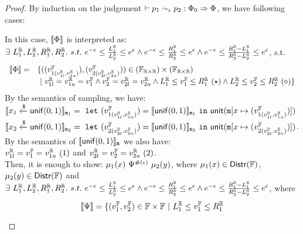 \documentclass[a4paper,11pt]{article}
\begin{document}
\begin{proof}
By induction on the judgement $\vdash p_1	
\sim_{\epsilon}
p_2 :
\Phi_0 \Rightarrow \Phi $, we have following cases:
\begin{itemize}
	In this case, 
	$\llbracket \Phi \rrbracket$ is interpreted as:
	$	\exists ~ L^{\mathbb{R}}_1, L^{\mathbb{R}}_2, R^{\mathbb{R}}_1, R^{\mathbb{R}}_2. ~ s.t. ~
	e^{-\epsilon} \leq 
	\frac{L^{\mathbb{R}}_1}{L^{\mathbb{R}}_2}
	\leq e^{\epsilon}
	\land
	e^{-\epsilon} \leq 
	\frac{R^{\mathbb{R}}_1}{R^{\mathbb{R}}_2}
	\leq e^{\epsilon}
	\land
	e^{-\epsilon} \leq 
	\frac{R^{\mathbb{R}}_1 - L^{\mathbb{R}}_1}{R^{\mathbb{R}}_2 - L^{\mathbb{R}}_2}
	\leq e^{\epsilon}$, s.t. 
\[
\begin{array}{rl}
	\sem{\Phi} = &
	\{((\fval_{1(\rval_{1l}, \rval_{1u})}), (\fval_{2(\rval_{2l}, \rval_{2u})})) 
	\in (\float_{\real \times \real}) \times (\float_{\real \times \real})\\
	& ~|~
	\rval_{1l} = \rval_{1u} = \fval_1 
	\land \fval_2 = \rval_{2l} = \rval_{2u}
	\land
	\rvalL_1 \leq \fval_1 \leq \rvalR_1 ~ (\star) 
	\land 
	\rvalL_2 \leq \fval_2 \leq \rvalR_2 ~ (\diamond)
	\}
\end{array}
\]
	By the semantics of sampling, we have:\\
	$\llbracket x_1 \xleftarrow{\$} \mathsf{unif}(0, 1) \rrbracket_{\mathtt{m}_1} = 
	~\mathtt{let}~ (v^{\mathbb{F}}_{1(v^{\mathbb{R}}_{1l}, v^{\mathbb{R}}_{1u})}) 
	= \llbracket \mathsf{unif}(0, 1) \rrbracket_{\mathtt{m}_1} 
	~\mathtt{in}~ 
	\mathsf{unit}(\mathtt{m}[x \mapsto (v^{\mathbb{F}}_{1(v^{\mathbb{R}}_{1l}, v^{\mathbb{R}}_{1u})})])
	$
	\\
	$\llbracket x_2 \xleftarrow{\$} \mathsf{unif}(0, 1) \rrbracket_{\mathtt{m}_2} = 
	~\mathtt{let}~ (v^{\mathbb{F}}_{2(v^{\mathbb{R}}_{2l}, v^{\mathbb{R}}_{2u})}) 
	= \llbracket \mathsf{unif}(0, 1) \rrbracket_{\mathtt{m}_2} 
	~\mathtt{in}~ 
	\mathsf{unit}(\mathtt{m}[x \mapsto (v^{\mathbb{F}}_{2(v^{\mathbb{R}}_{2l}, v^{\mathbb{R}}_{2u})})])
	$. \\
	By the semantics of $\llbracket \mathsf{unif}(0, 1) \rrbracket_{\mathtt{m}}$ we also have:
	\\
	$ v^{\mathbb{R}}_{1l} = v^{\mathbb{F}}_1 = v^{\mathbb{R}}_{1u} ~ (1)$ 
	and
	$ v^{\mathbb{R}}_{2l} = v^{\mathbb{F}}_2 = v^{\mathbb{R}}_{2u} ~ (2)$.
	\\
	Then, it is enough to show:
	${\mu_1}(x) ~ \Psi^{\#(\epsilon)} ~ {\mu_2}(y)$,
	where ${\mu_1}(x) \in \mathsf{Distr}(\mathbb{F})$, ${\mu_2}(y) \in \mathsf{Distr}(\mathbb{F})$ 
	and
	 $\exists ~ L^{\mathbb{R}}_1, L^{\mathbb{R}}_2, R^{\mathbb{R}}_1, R^{\mathbb{R}}_2. ~ s.t. ~
	e^{-\epsilon} \leq 
	\frac{L^{\mathbb{R}}_1}{L^{\mathbb{R}}_2}
	\leq e^{\epsilon}
	\land
	e^{-\epsilon} \leq 
	\frac{R^{\mathbb{R}}_1}{R^{\mathbb{R}}_2}
	\leq e^{\epsilon}
	\land
	e^{-\epsilon} \leq 
	\frac{R^{\mathbb{R}}_1 - L^{\mathbb{R}}_1}{R^{\mathbb{R}}_2 - L^{\mathbb{R}}_2}
	\leq e^{\epsilon}$, 
where
\[
	\llbracket \Psi \rrbracket = 
	\{(v^{\mathbb{F}}_1, v^{\mathbb{F}}_2) \in \mathbb{F} \times \mathbb{F} 
	~|~
	L^{\mathbb{R}}_1 \leq v^{\mathbb{F}}_1 \leq R^{\mathbb{R}}_1 
\]
\end{itemize}
\end{proof}
\end{document}
